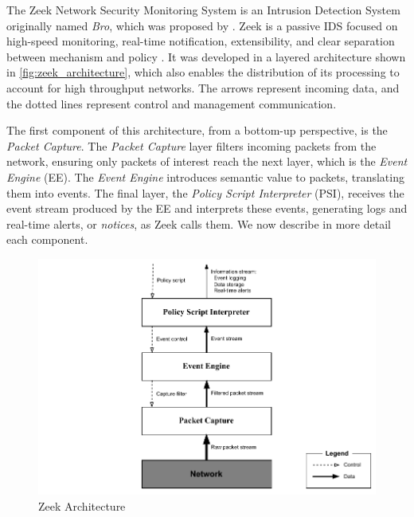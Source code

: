 The Zeek Network Security Monitoring System is an Intrusion Detection System originally named \textit{Bro}, which was proposed by . Zeek is a passive IDS focused on high-speed monitoring, real-time notification, extensibility, and clear separation between mechanism and policy \cite{Paxson1999}. It was developed in a layered architecture shown in \autoref{fig:zeek_architecture}, which also enables the distribution of its processing to account for high throughput networks. The arrows represent incoming data, and the dotted lines represent control and management communication.

The first component of this architecture, from a bottom-up perspective, is the \textit{Packet Capture}. The \textit{Packet Capture} layer filters incoming packets from the network, ensuring only packets of interest reach the next layer, which is the \textit{Event Engine} (EE). The \textit{Event Engine} introduces semantic value to packets, translating them into events. The final layer, the \textit{Policy Script Interpreter} (PSI), receives the event stream produced by the EE and interprets these events, generating logs and real-time alerts, or \textit{notices}, as Zeek calls them. We now describe in more detail each component.

\begin{figure}[htb]
    \caption{Zeek Architecture}
    \begin{center}
        \includegraphics[width=1.0\textwidth]{images/zeek-architecture.pdf}
    \end{center}
    \label{fig:zeek_architecture}
\end{figure}


